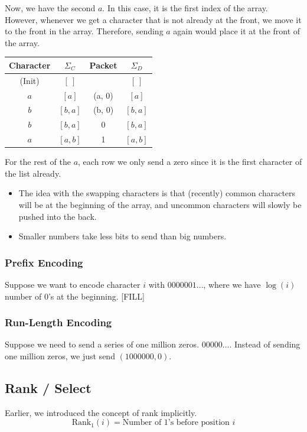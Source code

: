 \documentclass[10pt]{article}
\begin{document}
Now, we have the second $a$.  In this case, it is the first index of the array.  However, whenever we get a character that is not already at the front, we move it to the front in the array.  Therefore, sending $a$ again would place it at the front of the array.
\begin{center}
\begin{tabular}{|c|c|c|c|}
    \hline
    Character & $\Sigma_C$ & Packet & $\Sigma_D$ \\ \hline
    (Init) & $[~]$ & & $[~]$ \\ \hline
    $a$ & $[a]$ & (a, 0) & $[a]$ \\ \hline
    $b$ & $[b, a]$ & (b, 0) & $[b, a]$ \\ \hline
    $b$ & $[b, a]$ & 0 & $[b, a]$ \\ \hline
    $a$ & $[a, b]$ & 1 & $[a, b]$ \\ \hline
\end{tabular}
\end{center}
For the rest of the $a$, each row we only send a zero since it is the first character of the list already.
\begin{itemize}
    \item The idea with the swapping characters is that (recently) common characters will be at the beginning of the array, and uncommon characters will slowly be pushed into the back.
    \item Smaller numbers take less bits to send than big numbers.
\end{itemize}

\subsubsection*{Prefix Encoding}
Suppose we want to encode character $i$ with $0000001\dots$, where we have $\log(i)$ number of 0's at the beginning.
[FILL]

\subsubsection*{Run-Length Encoding}
Suppose we need to send a series of one million zeros.  $00000\dots$.  Instead of sending one million zeros, we just send $(1000000, 0)$.

\subsection*{Rank / Select}
Earlier, we introduced the concept of rank implicitly.  
\[\text{Rank}_1(i) = \text{Number of 1's before position }i\]
\end{document}
